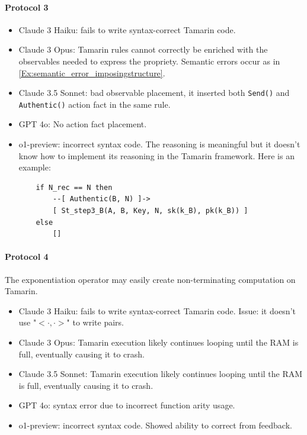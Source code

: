 \paragraph{Protocol 3}

\begin{itemize}
    \item Claude 3 Haiku: fails to write syntax-correct Tamarin code.
    \item Claude 3 Opus: Tamarin rules cannot correctly be enriched with the observables needed to express the propriety. Semantic errors occur as in \ref{Ex:semantic_error_imposingstructure}.
    \item Claude 3.5 Sonnet: bad observable placement, it inserted both \texttt{Send()} and \texttt{Authentic()} action fact in the same rule.
    \item GPT 4o: No action fact placement.
    \item o1-preview: incorrect syntax code. The reasoning is meaningful but it doesn't know how to implement its reasoning in the Tamarin framework. Here is an example: 
    \begin{verbatim}
    if N_rec == N then
        --[ Authentic(B, N) ]->
        [ St_step3_B(A, B, Key, N, sk(k_B), pk(k_B)) ]
    else
        []
    \end{verbatim}
\end{itemize}


\paragraph{Protocol 4}
The exponentiation operator may easily create non-terminating computation on Tamarin.
\begin{itemize}
    \item Claude 3 Haiku: fails to write syntax-correct Tamarin code. Issue: it doesn't use "$<\cdot, \cdot>$" to write pairs.
    \item Claude 3 Opus: Tamarin execution likely continues looping until the RAM is full, eventually causing it to crash.
    \item Claude 3.5 Sonnet: Tamarin execution likely continues looping until the RAM is full, eventually causing it to crash.
    \item GPT 4o: syntax error due to incorrect function arity usage.
    \item o1-preview: incorrect syntax code. Showed ability to correct from feedback.
\end{itemize}


